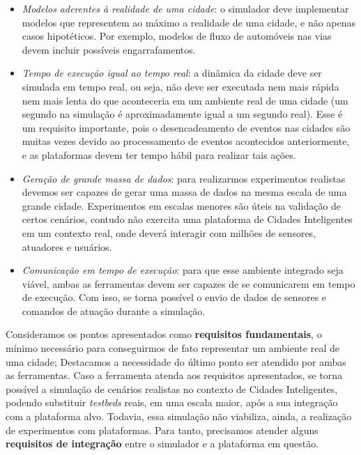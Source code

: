 \begin{itemize}
    \item \textit{Modelos aderentes à realidade de uma cidade}: o simulador deve implementar modelos que representem ao máximo a realidade de uma cidade, e não apenas casos hipotéticos.
        Por exemplo, modelos de fluxo de automóveis nas vias devem incluir possíveis engarrafamentos.

    \item \textit{Tempo de execução igual ao tempo real}: a dinâmica da cidade deve ser simulada em tempo real, ou seja, não deve ser executada nem mais rápida nem mais lenta do que aconteceria
        em um ambiente real de uma cidade (um segundo na simulação é aproximadamente igual a um segundo real).
        Esse é um requisito importante, pois o desencadeamento de eventos nas cidades são muitas vezes devido ao processamento de eventos acontecidos anteriormente, e as plataformas
        devem ter tempo hábil para realizar tais ações.

    \item \textit{Geração de grande massa de dados}: para realizarmos experimentos realistas devemos ser capazes de gerar uma massa de dados na mesma escala de uma grande cidade.
        Experimentos em escalas menores são úteis na validação de certos cenários, contudo não exercita uma plataforma de Cidades Inteligentes em um contexto real, onde deverá
        interagir com milhões de sensores, atuadores e usuários.

    \item \textit{Comunicação em tempo de execução}: para que esse ambiente integrado seja viável, ambas as ferramentas devem ser capazes de se comunicarem em tempo de execução.
        Com isso, se torna possível o envio de dados de sensores e comandos de atuação durante a simulação.
\end{itemize}

Consideramos os pontos apresentados como \textbf{requisitos fundamentais}, o mínimo necessário para conseguirmos de fato representar um ambiente real de uma cidade; Destacamos a necessidade
do último ponto ser atendido por ambas as ferramentas.
Caso a ferramenta atenda aos requisitos apresentados, se torna possível a simulação de cenários realistas no contexto de Cidades Inteligentes, podendo substituir \textit{testbeds}
reais, em uma escala maior, após a sua integração com a plataforma alvo.
Todavia, essa simulação não viabiliza, ainda, a realização de experimentos com plataformas.
Para tanto, precisamos atender alguns \textbf{requisitos de integração} entre o simulador e a plataforma em questão.

